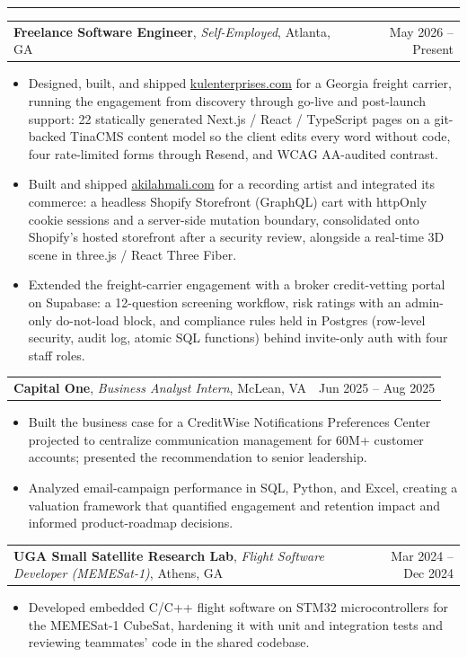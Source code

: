 \documentclass[letterpaper,10pt]{article}
\makeatletter
\newcommand{\IfEmpty}[3]{\if\relax\detokenize{#1}\relax#2\else#3\fi}
\newcommand{\sectiontitle}[1]{\vspace{4pt}{\textbf{\large #1}}\par\vspace{-6pt}\rule{\textwidth}{0.4pt}\par\vspace{1pt}}
\newcommand{\experienceheading}[4]{\begin{tabularx}{\textwidth}{@{}X r@{}}\textbf{#1}\IfEmpty{#2}{}{, \textit{#2}}\IfEmpty{#3}{}{, #3} & #4 \\ \end{tabularx}\par\vspace{1pt}}
\makeatother
\begin{document}
\sectiontitle{EXPERIENCE}
\experienceheading{Freelance Software Engineer}{Self-Employed}{Atlanta, GA}{May 2026 -- Present}
\begin{itemize}
\item Designed, built, and shipped \href{https://www.kulenterprises.com}{kulenterprises.com} for a Georgia freight carrier, running the engagement from discovery through go-live and post-launch support: 22 statically generated Next.js / React / TypeScript pages on a git-backed TinaCMS content model so the client edits every word without code, four rate-limited forms through Resend, and WCAG AA-audited contrast.
\item Built and shipped \href{https://www.akilahmali.com}{akilahmali.com} for a recording artist and integrated its commerce: a headless Shopify Storefront (GraphQL) cart with httpOnly cookie sessions and a server-side mutation boundary, consolidated onto Shopify's hosted storefront after a security review, alongside a real-time 3D scene in three.js / React Three Fiber.
\item Extended the freight-carrier engagement with a broker credit-vetting portal on Supabase: a 12-question screening workflow, risk ratings with an admin-only do-not-load block, and compliance rules held in Postgres (row-level security, audit log, atomic SQL functions) behind invite-only auth with four staff roles.
\end{itemize}
\experienceheading{Capital One}{Business Analyst Intern}{McLean, VA}{Jun 2025 -- Aug 2025}
\begin{itemize}
\item Built the business case for a CreditWise Notifications Preferences Center projected to centralize communication management for 60M+ customer accounts; presented the recommendation to senior leadership.
\item Analyzed email-campaign performance in SQL, Python, and Excel, creating a valuation framework that quantified engagement and retention impact and informed product-roadmap decisions.
\end{itemize}
\experienceheading{UGA Small Satellite Research Lab}{Flight Software Developer (MEMESat-1)}{Athens, GA}{Mar 2024 -- Dec 2024}
\begin{itemize}
\item Developed embedded C/C++ flight software on STM32 microcontrollers for the MEMESat-1 CubeSat, hardening it with unit and integration tests and reviewing teammates' code in the shared codebase.
\end{itemize}
\end{document}
